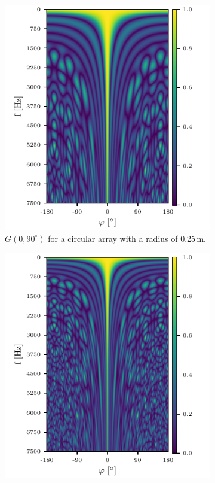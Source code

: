 \begin{figure}[h]
	\centering
	\begin{subfigure}[t]{0.45\textwidth}
		\centering
		\includegraphics[width=\textwidth]{images/3_source_localization/circ_f_sweep_0.pdf}
		\caption{$G(0, 90^\circ)$ for a circular array with a radius of 0.25\,m.}
		\label{ssl:fig:f_dep0}
	\end{subfigure}
	\hfill
	\begin{subfigure}[t]{0.45\textwidth}
		\centering
		\includegraphics[width=\textwidth]{images/3_source_localization/circ_f_sweep_1.pdf}

\end{subfigure}
\end{figure}
